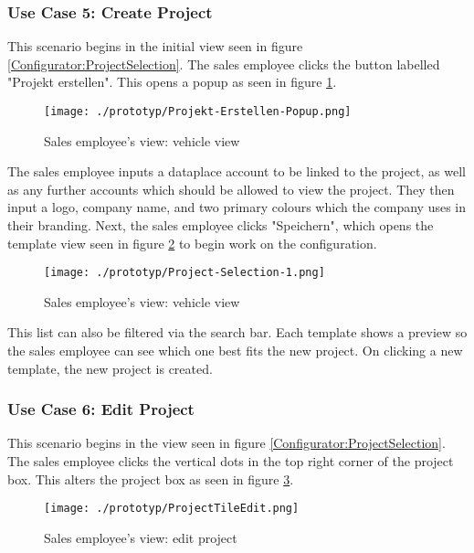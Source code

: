 \subsubsection{Use Case 5: Create Project}
This scenario begins in the initial view seen in figure \ref{Configurator:ProjectSelection}. The sales employee clicks the button labelled "Projekt erstellen". This opens a popup as seen in figure \ref{Configurator:CreateProjectPopup}. 

\begin{figure}[ht]
  \centering
  \texttt{[image: ./prototyp/Projekt-Erstellen-Popup.png]}
  \caption{Sales employee's view: vehicle view}
  \label{Configurator:CreateProjectPopup}
\end{figure}

The sales employee inputs a \gls{dataplace} account to be linked to the project, as well as any further accounts which should be allowed to view the project. They then input a logo, company name, and two primary colours which the company uses in their branding. Next, the sales employee clicks "Speichern", which opens the template view seen in figure \ref{Configurator:Template} to begin work on the configuration.

\begin{figure}[ht]
  \centering
  \texttt{[image: ./prototyp/Project-Selection-1.png]}
  \caption{Sales employee's view: vehicle view}
  \label{Configurator:Template}
\end{figure}
This list can also be filtered via the search bar. Each template shows a preview so the sales employee can see which one best fits the new project. On clicking a new template, the new project is created. %


\subsubsection{Use Case 6: Edit Project}
This scenario begins in the view seen in figure \ref{Configurator:ProjectSelection}. The sales employee clicks the vertical dots in the top right corner of the project box. This alters the project box as seen in figure \ref{Configurator:ProjectTileEdit}.

\begin{figure}[ht]
  \centering
  \texttt{[image: ./prototyp/ProjectTileEdit.png]}
  \caption{Sales employee's view: edit project} %
  \label{Configurator:ProjectTileEdit}
\end{figure}

